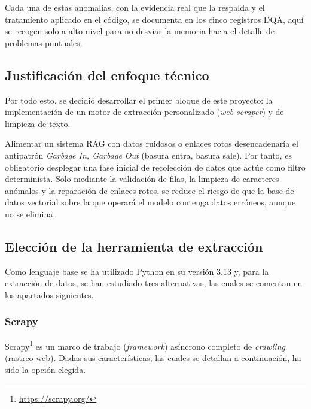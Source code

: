 Cada una de estas anomalías, con la evidencia real que la respalda y el tratamiento aplicado en el código, se documenta en los cinco registros DQA\cite{repo_tfg}, aquí se recogen solo a alto nivel para no desviar la memoria hacia el detalle de problemas puntuales.


\subsection{Justificación del enfoque técnico}

Por todo esto, se decidió desarrollar el primer bloque de este proyecto: la implementación de un motor de extracción personalizado (\textit{web scraper}) y de limpieza de texto.

Alimentar un sistema RAG con datos ruidosos o enlaces rotos desencadenaría el antipatrón \textit{Garbage In, Garbage Out} (basura entra, basura sale). Por tanto, es obligatorio desplegar una fase inicial de recolección de datos que actúe como filtro determinista. Solo mediante la validación de filas, la limpieza de caracteres anómalos y la reparación de enlaces rotos, se reduce el riesgo de que la base de datos vectorial sobre la que operará el modelo contenga datos erróneos, aunque no se elimina.


\subsection[Elección de la herramienta de extracción]{Elección de la herramienta de extracción}
\label{sec:eleccion_herramientas}

Como lenguaje base se ha utilizado Python en su versión 3.13 y, para la extracción de datos, se han estudiado tres alternativas, las cuales se comentan en los apartados siguientes.

\subsubsection{Scrapy\cite{scrapy}}

Scrapy\footnote{\url{https://scrapy.org/}} es un marco de trabajo (\textit{framework}) asíncrono completo de \textit{crawling} (rastreo web). Dadas sus características, las cuales se detallan a continuación, ha sido la opción elegida.

